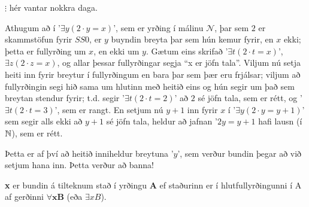 \documentclass[12pt]{article}
\begin{document}
$\vdots$\: \: \:hér vantar nokkra daga.


Athugum að í '$\exists y (2 \cdot y = x )$', sem er yrðing í málinu $\mathcal{N}$,
þar sem $2$ er skammstöfun fyrir $SS0$, er $y$ buyndin breyta þar sem hún kemur fyrir, en $x$
ekki; þetta er fullyrðing um $x$, en ekki um $y$. Gætum eins skrifað
'$\exists t (2 \cdot t = x )$', $\exists z (2 \cdot z = x )$, og
allar þessar fullyrðingar segja ``x er jöfn tala''. Viljum nú setja heiti inn fyrir
breytur í fullyrðingum en bara þar sem þær eru frjálsar; viljum að fullyrðingin segi
hið sama um hlutinn með heitið eins og hún segir um það sem breytan stendur
fyrir; t.d. segir '$\exists t (2 \cdot t = 2 )$' að $2$ sé jöfn tala, sem er rétt,
og '$\exists t (2 \cdot t = 3 )$', sem er rangt. En setjum nú $y+1$ inn fyrir $x$
í '$\exists y (2 \cdot y = y+1 )$' sem segir alls ekki að $y+1$
sé jöfn tala, heldur að jafnan '$2y = y+1$ hafi lausn (í $\mathbb{N}$), sem er rétt.

Þetta er af því að heitið inniheldur breytuna '$y$', sem verður bundin þegar
að við setjum hana inn. Þetta verður að banna!

\begin{ath}
 \textbf{x} er bundin á tilteknum stað í yrðingu \textbf{A} ef
staðurinn er í hlutfullyrðingunni í A af gerðinni
$\forall \mathbf{x} \mathbf{B}$ (eða $\exists x B$).
\end{ath}
\end{document}
